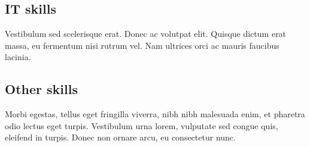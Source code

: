 \documentclass{article}
\begin{document}
\subsection{IT skills}
Vestibulum sed scelerisque erat. Donec ac volutpat elit. Quisque dictum erat
massa, eu fermentum nisi rutrum vel. Nam ultrices orci ac mauris faucibus
lacinia.

\subsection{Other skills}
Morbi egestas, tellus eget fringilla viverra, nibh nibh malesuada
enim, et pharetra odio lectus eget turpis. Vestibulum urna lorem, vulputate sed
congue quis, eleifend in turpis. Donec non ornare arcu, eu consectetur nunc.
\end{document}
